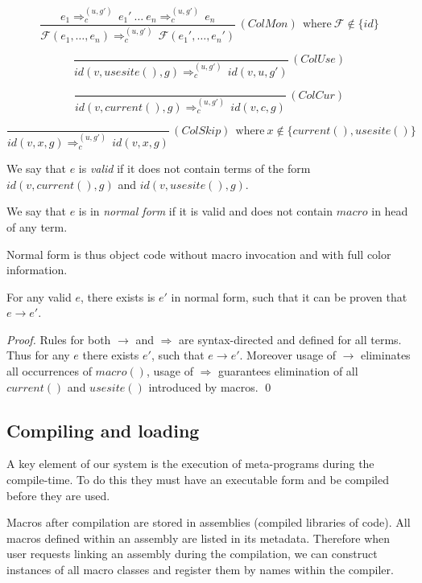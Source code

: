 \documentclass{llncs}
\newcommand{\infrule}[3]{
  \displaystyle
  \frac{#1}{#2}
  \, #3
}
\newcommand{\colr}[2]{#1 \Rightarrow^{(u, g')}_{c} \, #2}
\begin{document}
$$
  \infrule{
    \colr{e_1}{e_1'} \ \ldots\ \colr{e_n}{e_n}
  }{
    \colr{
      \mathcal{F}(e_1, \ldots, e_n)
    }{
      \mathcal{F}(e_1', \ldots, e_n')
    }
  }{(ColMon)\ \ \textrm{where}\ \mathcal{F} \notin \{ id \}}
$$

$$
  \infrule{
  }{
    \colr{
      id (v, usesite (), g)
    }{
      id (v, u, g')
    }
  }{(ColUse)}
$$

$$
  \infrule{
  }{
    \colr{
      id (v, current (), g)
    }{
      id (v, c, g)
    }
  }{(ColCur)}
$$

$$
  \infrule{
  }{
    \colr{
      id (v, x, g)
    }{
      id (v, x, g)
    }
  }{(ColSkip)\ \ \textrm{where}\ x \notin \{ current (), usesite () \}}
$$

\begin{definition}
We say that $e$ is \emph{valid} if it does not
contain terms of the form $id(v, current(), g)$ and $id(v, usesite(), g)$.
\end{definition}

\begin{definition}
We say that $e$ is in \emph{normal form} if it is
valid and does not contain $macro$ in head of any term.
\end{definition}

Normal form is thus object code without macro invocation and with full
color information.

\begin{theorem}
For any valid $e$, there exists is $e'$ in normal form,
such that it can be proven that $e \rightarrow e'$.
\end{theorem}

\begin{proof}
Rules for both $\rightarrow$ and $\Rightarrow$ are
syntax-directed and defined for all terms. Thus for any $e$ there exists
$e'$, such that $e \rightarrow e'$. Moreover usage of $\rightarrow$
eliminates all occurrences of $macro()$, usage of $\Rightarrow$ guarantees
elimination of all $current()$ and $usesite()$ introduced by macros.
\qed
\end{proof}

\subsection{Compiling and loading}
A key element of our system is the execution of meta-programs during 
the compile-time. To do this they must have an executable form and be
compiled before they are used.

Macros after compilation are stored in assemblies (compiled libraries
of code). All macros defined within an assembly are listed in its metadata.
Therefore when user requests linking an assembly during the compilation,
we can construct instances of all macro classes and register them by
names within the compiler.
\end{document}
